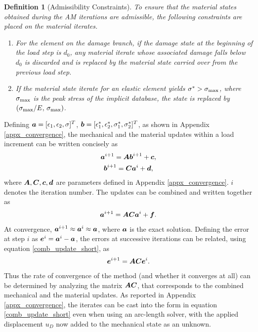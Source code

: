\documentclass[10pt]{cas-sc}
\newtheorem{definition}{Definition}
\newcommand{\added}[1]{#1}
\newenvironment{addedblock}{}{}
\begin{document}
\begin{addedblock}
	\begin{definition}[Admissibility Constraints]\label{def:branch_restrictions}
		To ensure that the material states obtained during the AM iterations are admissible, the following constraints are placed on the material iterates.
		\begin{enumerate}
			\item\label{br:irreversibility} For the element on the damage branch, if the damage state at the beginning of the load step is $d_0$, any material iterate whose associated damage falls below $d_0$ is discarded and is replaced by the material state carried over from the previous load step.
			\item\label{br:peak_cap} If the material state iterate for an elastic element yields $\sigma^* > \sigma_{\rm max}$, where $\sigma_{\rm max}$ is the peak stress of the implicit database, the state is replaced by $(\sigma_{\rm max}/E,\,\sigma_{\rm max})$.
		\end{enumerate}
	\end{definition}	
\end{addedblock}


Defining $\mbox{\boldmath $a$} = [\epsilon_1,\epsilon_2,\sigma]^T$, $\mbox{\boldmath $b$} = [\epsilon^*_1,\epsilon^*_2,\sigma^*_1,\sigma^*_2]^T$, as shown in Appendix \ref{appx_convergence}, the mechanical and the material updates within a load increment can be written concisely as 
\begin{gather}
	\mbox{\boldmath $a$}^{i+1} = \mbox{\boldmath $A$} \mbox{\boldmath $b$}^{i+1} + \mbox{\boldmath $c$}, \label{mech_update_short}\\
	\mbox{\boldmath $b$}^{i+1} = \mbox{\boldmath $C$} \mbox{\boldmath $a$}^{i} + \mbox{\boldmath $d$},  \label{mat_update_short}
\end{gather} 
where $\mbox{\boldmath $A$},\mbox{\boldmath $C$},\mbox{\boldmath $c$},\mbox{\boldmath $d$}$ are parameters defined in Appendix \ref{appx_convergence}. $i$ denotes the iteration number. The updates can be combined and written together as
\begin{equation}
	\mbox{\boldmath $a$}^{i+1} =  \mbox{\boldmath $A$}  \mbox{\boldmath $C$}	\mbox{\boldmath $a$}^{i} + \mbox{\boldmath $f$}.\label{comb_update_short}
\end{equation}
At convergence, $\mbox{\boldmath $a$}^{i+1} \approx \mbox{\boldmath $a$}^{i} \approx \mbox{\boldmath $a$}$, where $\mbox{\boldmath $a$}$ is the exact solution. Defining the error at step $i$ as $\mbox{\boldmath $e$}^i = \mbox{\boldmath $a$}^{i} - \mbox{\boldmath $a$}$, the errors at successive iterations can be related, using equation \ref{comb_update_short}, as
\begin{equation}
	\mbox{\boldmath $e$}^{i+1} =  \mbox{\boldmath $A$}  \mbox{\boldmath $C$}	\mbox{\boldmath $e$}^{i}.
\end{equation}
Thus the rate of convergence of the method (and whether it converges at all) can be determined by analyzing the matrix $\mbox{\boldmath $A$} \mbox{\boldmath $C$} $, that corresponds to the combined mechanical and the material updates. \added{As reported in Appendix \ref{appx_convergence}, the iterates can be cast into the form in equation \ref{comb_update_short} even when using an arc-length solver, with the applied displacement $u_D$ now added to the mechanical state as an unknown.}
\end{document}
